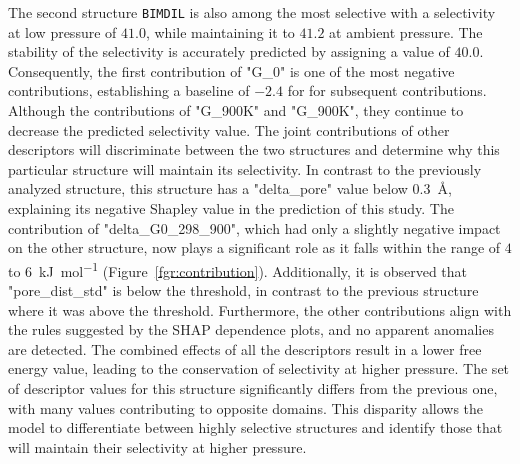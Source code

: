 \documentclass[main]{subfiles}
\begin{document}
The second structure \texttt{BIMDIL} is also among the most selective with a selectivity at low pressure of $41.0$, while maintaining it to $41.2$ at ambient pressure. The stability of the selectivity is accurately predicted by assigning a value of $40.0$. Consequently, the first contribution of "G\_0" is one of the most negative contributions, establishing a baseline of $-2.4$ for for subsequent contributions. Although the contributions of "G\_900K" and "G\_900K", they continue to decrease the predicted selectivity value. The joint contributions of other descriptors will discriminate between the two structures and determine why this particular structure will maintain its selectivity. In contrast to the previously analyzed structure, this structure has a "delta\_pore" value below \SI{0.3}{\angstrom}, explaining its negative Shapley value in the prediction of this study. The contribution of "delta\_G0\_298\_900", which had only a slightly negative impact on the other structure, now plays a significant role as it falls within the range of $4$ to \SI{6}{\kilo\joule\per\mole} (Figure~\ref{fgr:contribution}). Additionally, it is observed that "pore\_dist\_std" is below the threshold, in contrast to the previous structure where it was above the threshold. Furthermore, the other contributions align with the rules suggested by the SHAP dependence plots, and no apparent anomalies are detected. The combined effects of all the descriptors result in a lower free energy value, leading to the conservation of selectivity at higher pressure. The set of descriptor values for this structure significantly differs from the previous one, with many values contributing to opposite domains. This disparity allows the model to differentiate between highly selective structures and identify those that will maintain their selectivity at higher pressure.
\end{document}
